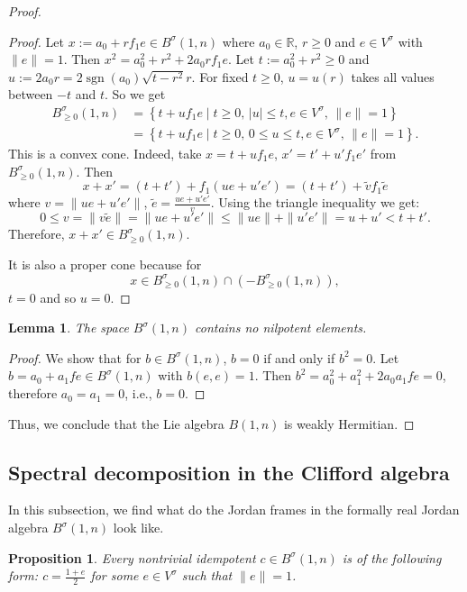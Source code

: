 \documentclass[a4paper,oneside,11pt]{amsart}
\DeclareMathOperator{\sgn}{sgn}
\newcommand{\R}{\mathbb R}
\theoremstyle{plain}
\newtheorem{lem}[teo]{Lemma}
\newtheorem{prop}[teo]{Proposition}
\theoremstyle{definition}
\theoremstyle{remark}
\begin{document}
\begin{proof}
\begin{proof}
Let $x:=a_0+rf_1e\in B^{\sigma}(1,n)$ where $a_0\in\R$, $r\geq 0$ and $e\in V^\sigma$ with $\|e\|=1$. Then $x^2=a_0^2+r^2+2a_0rf_1e.$
Let $t:=a_0^2+r^2\geq 0$ and $u:=2a_0r=2\sgn(a_0)\sqrt{t-r^2}r$. For fixed $t\geq 0$, $u=u(r)$ takes all values between $-t$ and $t$. So we get
\begin{align*}
B^{\sigma}_{\geq 0}(1,n)& =\left\{t+uf_1e\mid t\geq 0,\, |u|\leq t, e\in V^\sigma,\, \|e\|=1\right\}\\
& =\left\{t+uf_1e\mid t\geq 0,\, 0\leq u\leq t, e\in V^\sigma,\, \|e\|=1\right\}.
\end{align*}
This is a convex cone. Indeed, take $x=t+uf_1e$, $x'=t'+u'f_1e'$ from $B^{\sigma}_{\geq 0}(1,n)$. Then $$x+x'=(t+t')+f_1(ue+u'e')=(t+t')+\tilde vf_1\tilde e$$
where
$v=\|ue+u'e'\|$, $\tilde e=\frac{ue+u'e'}{v}.$
Using the triangle inequality we get:
$$0\leq v=\|v\tilde e\|=\|ue+u'e'\|\leq\|ue\|+\|u'e'\|=u+u'<t+t'.$$
Therefore, $x+x'\in B^{\sigma}_{\geq 0}(1,n)$.

It is also a proper cone because for
$$x\in B^{\sigma}_{\geq 0}(1,n)\cap(-B^{\sigma}_{\geq 0}(1,n)),$$
$t=0$ and so $u=0$.
\end{proof}

\begin{lem}\label{lem:Herm1}
The space $B^\sigma(1,n)$ contains no nilpotent elements.
\end{lem}

\begin{proof} We show that for $b\in B^\sigma(1,n)$, $b=0$ if and only if $b^2=0$. Let $b=a_0+a_1fe\in B^\sigma(1,n)$ with $b(e,e)=1$. Then $b^2=a_0^2+a_1^2+2a_0a_1fe=0$, therefore $a_0=a_1=0$, i.e., $b=0$.
\end{proof}

Thus, we conclude that the Lie algebra $B(1,n)$ is weakly Hermitian.
\end{proof}


\subsection{Spectral decomposition in the Clifford algebra}

In this subsection, we find what do the Jordan frames in the formally real Jordan algebra $B^{\sigma}(1,n)$ look like.

\begin{prop}
Every nontrivial idempotent $c\in B^{\sigma}(1,n)$ is of the following form: $c=\frac{1+e}{2}$ for some $e\in V^\sigma$ such that $\|e\|=1$.
\end{prop}
\end{document}
